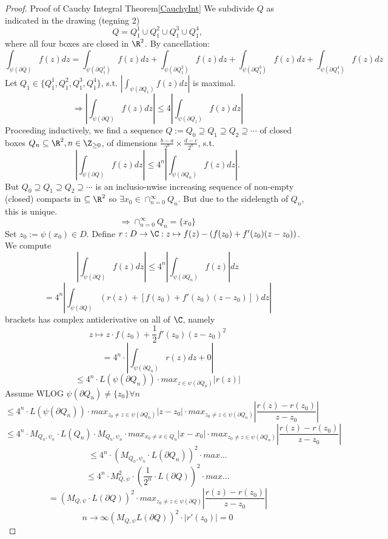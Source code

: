 \begin{proof}
  Proof of Cauchy Integral Theorem\ref{CauchyInt}
  \newline We subdivide $Q$ as indicated in the drawing (tegning 2)
    $$Q=Q_1^1\cup Q_1^2 \cup Q_1^3 \cup Q_1^4,$$
  where all four boxes are closed in $\R^2$. By cancellation:
    $$\int_{\psi(\partial Q)}^{}f(z)dz=\int_{\psi(\partial Q_1^1)}^{}f(z)dz+\int_{\psi(\partial Q_1^2)}^{}f(z)dz+\int_{\psi(\partial Q_1^3)}^{}f(z)dz+\int_{\psi(\partial Q_1^4)}^{}f(z)dz$$
    Let $Q_1\in \{Q_1^1, Q_1^2 , Q_1^3 , Q_1^4\}$, s.t. $\left|\int_{\psi(\partial Q_1)}^{}f(z)dz\right|$ is maximal.
      $$\Rightarrow \left|\int_{\psi(\partial Q)}^{}f(z)dz\right|\leq 4\left|\int_{\psi(\partial Q_1)}^{}f(z)dz\right|$$
      Proceeding inductively, we find a sequence $Q:=Q_0\supseteq Q_1 \supseteq Q_2 \supseteq \cdots $ of closed boxes $Q_n \subseteq \R^2, n\in \Z_{\geq 0}$, of dimensions $\frac{b-a}{2^n}\times \frac{d-c}{2^n}$, s.t.
        $$\left|\int_{\psi(\partial Q)}^{}f(z)dz\right|\leq 4^n\left|\int_{\psi(\partial Q_n)}^{}f(z)dz\right|.$$
        But $Q_0\supseteq Q_1 \supseteq Q_2 \supseteq \cdots$ is an inclusio-nwise increasing sequence of non-empty (closed) compacts in $\subseteq\R^2$ so $\exists x_0 \in \cap_{n=0}^\infty Q_n$. But due to the sidelength of $Q_n$, this is unique.
          $$\Rightarrow \cap_{n=0}^\infty Q_n=\{x_0\}$$
        Set $z_0:=\psi(x_0)\in D$. Define $r:D\to \C:z\mapsto f(z)-\left(f(z_0)+f'(z_0)(z-z_0)\right)$.
        \newline We compute
          $$\left|\int_{\psi(\partial Q)}^{}f(z)dz\right|\leq 4^n\left|\int_{\psi(\partial Q_n)}^{}f(z)\right|dz$$
          $$=4^n\left|\int_{\psi(\partial Q)}^{}\left(r(z)+\left[f(z_0)+f'(z_0)(z-z_0)\right]\right)dz\right|$$
          brackets has complex antiderivative on all of $\C$, namely
              $$z\mapsto z \cdot f(z_0)+\frac{1}{2}f'(z_0)(z-z_0)^2$$
          $$=4^n \cdot \left|\int_{\psi(\partial Q_n)}^{}r(z)dz+0\right|$$
          $$\leq 4^n\cdot L \left(\psi(\partial Q_n)\right) \cdot max_{z\in \psi(\partial Q_n)}|r(z)|$$
          Assume WLOG $\psi(\partial Q_n)\neq \{z_0\} \forall n$
          $$\leq 4^n \cdot L \left(\psi(\partial Q_n)\right) \cdot max_{z_0\neq z\in\psi(\partial Q_n)}|z-z_0| \cdot max_{z_0\neq z\in \psi(\partial Q_n)}\left|\frac{r(z)-r(z_0)}{z-z_0}\right|$$
          $$\leq 4^n \cdot M_{Q_n,\psi_n} \cdot L(Q_n) \cdot M_{Q_n,\psi_n} \cdot max_{x_0\neq x\in Q_n}|x-x_0| \cdot max_{z_0\neq z\in \psi(\partial Q_n)}\left|\frac{r(z)-r(z_0)}{z-z_0}\right|$$
          $$\leq 4^n \cdot \left(M_{Q_n,\psi_n} \cdot L(\partial Q_n)\right)^2 \cdot max ...$$
          $$\leq 4^n \cdot M_{Q,\psi}^2 \cdot \left(\frac{1}{2^n} \cdot L(\partial Q)\right)^2 \cdot max ...$$
          $$=\left(M_{Q,\psi} \cdot L(\partial Q)\right)^2 \cdot max_{z_0\neq z\in \psi(\partial Q)}\left|\frac{r(z)-r(z_0)}{z-z_0}\right|$$
          $$n\to \infty \left(M_{Q,\psi}L(\partial Q)\right)^2 \cdot |r'(z_0)|=0$$
          \qedhere
\end{proof}
